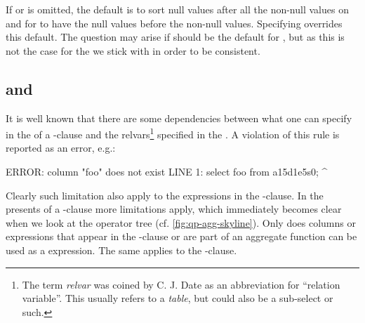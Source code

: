 If  or  is omitted, the
default is to sort null values after all the non-null values on
 and for  to have
the null values before the non-null values.  Specifying
 overrides this default.  
The question
may arise if  should be the default for
, but as this is not the case for the
 we stick with  in order to
be consistent.


\subsection{ and }
It is well known that there are some dependencies between what one can
specify in the  of a -clause and
the relvars\footnote{The term \emph{relvar} was coined by C. J. Date
as an abbreviation for ``relation variable''.  This usually refers to
a \emph{table}, but could also be a sub-select or such.} specified
in the .  A violation of this rule is reported as an
error, e.g.:

\begin{interactive}
ERROR:  column "foo" does not exist
LINE 1: select foo from a15d1e5s0;
               ^
\end{interactive}

\noindent
Clearly such limitation also apply to the expressions in the
-clause.  In the presents of a
-clause more limitations apply, which immediately
becomes clear when we look at the operator tree
(cf. \autoref{fig:qp-agg-skyline}).  Only does columns or expressions
that appear in the -clause or are part of an
aggregate function can be used as a  expression.
The same applies to the -clause.

